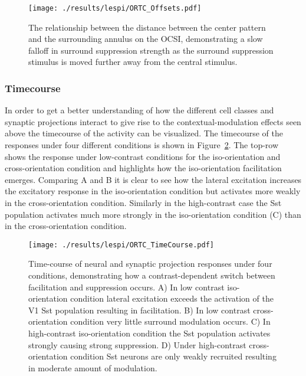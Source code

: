 \begin{figure}
	\centering
        \texttt{[image: ./results/lespi/ORTC\_Offsets.pdf]}
	\caption[Spatial dependence of surround suppression.]{The
      relationship between the distance between the center pattern and
      the surrounding annulus on the OCSI, demonstrating a slow
      falloff in surround suppression strength as the surround
      suppression stimulus is moved further away from the central stimulus.}
	\label{ORTC_OffsetCurve}
\end{figure}

\subsubsection{Timecourse}

In order to get a better understanding of how the different cell
classes and synaptic projections interact to give rise to the
contextual-modulation effects seen above the timecourse of the
activity can be visualized. The timecourse of the responses under four
different conditions is shown in Figure~\ref{ORTC_TimeCourse}. The
top-row shows the response under low-contrast conditions for the
iso-orientation and cross-orientation condition and highlights how the
iso-orientation facilitation emerges. Comparing A and B it is clear to
see how the lateral excitation increases the excitatory response in
the iso-orientation condition but activates more weakly in the
cross-orientation condition. Similarly in the high-contrast case the
Sst population activates much more strongly in the iso-orientation
condition (C) than in the cross-orientation condition.

\begin{figure}
	\centering
        \texttt{[image: ./results/lespi/ORTC\_TimeCourse.pdf]}
	\caption[Time-course of neural and synaptic projection responses
      under four conditions, demonstrating how a contrast-dependent
      switch between facilitation and suppression occurs]{Time-course
      of neural and synaptic projection responses under four
      conditions, demonstrating how a contrast-dependent switch
      between facilitation and suppression occurs. A) In low contrast
      iso-orientation condition lateral excitation exceeds the
      activation of the V1 Sst population resulting in
      facilitation. B) In low contrast cross-orientation condition
      very little surround modulation occurs. C) In high-contrast
      iso-orientation condition the Sst population activates strongly
      causing strong suppression. D) Under high-contrast
      cross-orientation condition Sst neurons are only weakly
      recruited resulting in moderate amount of modulation.}
	\label{ORTC_TimeCourse}
\end{figure}

